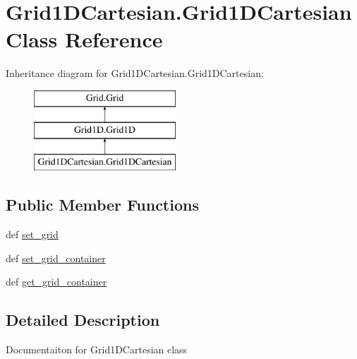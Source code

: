 \hypertarget{classGrid1DCartesian_1_1Grid1DCartesian}{\section{Grid1\-D\-Cartesian.\-Grid1\-D\-Cartesian Class Reference}
\label{classGrid1DCartesian_1_1Grid1DCartesian}
}
Inheritance diagram for Grid1\-D\-Cartesian.\-Grid1\-D\-Cartesian\-:\begin{figure}[H]
\begin{center}
\leavevmode
\includegraphics[height=3.000000cm]{classGrid1DCartesian_1_1Grid1DCartesian}
\end{center}
\end{figure}
\subsection*{Public Member Functions}
\begin{DoxyCompactItemize}
\item 
def \hyperlink{classGrid1DCartesian_1_1Grid1DCartesian_a7aa69514393f49e62b5b6e52474bba66}{set\-\_\-grid}
\item 
def \hyperlink{classGrid1DCartesian_1_1Grid1DCartesian_ab65433172dcaf48d7e5b70bf8efe0c6f}{set\-\_\-grid\-\_\-container}
\item 
def \hyperlink{classGrid1DCartesian_1_1Grid1DCartesian_a54f1f22b80717d8f6a809a6a9f3c649b}{get\-\_\-grid\-\_\-container}
\end{DoxyCompactItemize}


\subsection{Detailed Description}
\begin{DoxyVerb}Documentaiton for Grid1DCartesian class
\end{DoxyVerb}
 

